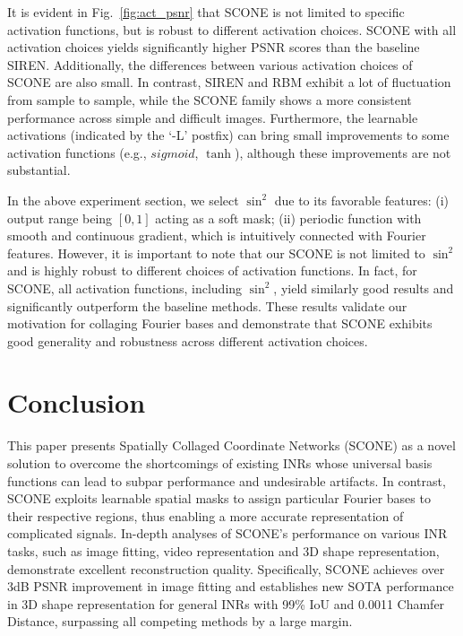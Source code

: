 \documentclass[letterpaper]{article} %
\begin{document}
It is evident in Fig.~\ref{fig:act_psnr} that SCONE is not limited to specific activation functions, but is robust to different activation choices. SCONE with all activation choices yields significantly higher PSNR scores than the baseline SIREN. Additionally, the differences between various activation choices of SCONE are also small. In contrast, SIREN and RBM exhibit a lot of fluctuation from sample to sample, while the SCONE family shows a more consistent performance across simple and difficult images. Furthermore, the learnable activations (indicated by the `-L' postfix) can bring small improvements to some activation functions (e.g.,  $\textit{sigmoid}$, $\tanh$), although these improvements are not substantial.


In the above experiment section,  we select $\sin^2$ due to its favorable features: (i) output range being $[0,1]$ acting as a soft mask; (ii) periodic function with smooth and continuous gradient, which is intuitively connected with Fourier features. However, it is important to note that our SCONE is not limited to $\sin^2$ and is highly robust to different choices of activation functions. In fact, for SCONE, all activation functions, including $\sin^2$, yield similarly good results and significantly outperform the baseline methods. These results validate our motivation for collaging Fourier bases and demonstrate that SCONE exhibits good generality and robustness across different activation choices.

\section{Conclusion}
\label{sec:conclusion}
This paper presents Spatially Collaged Coordinate Networks (SCONE) as a novel solution to overcome the shortcomings of existing INRs whose universal basis functions can lead to subpar performance and undesirable artifacts. In contrast, SCONE exploits learnable spatial masks to assign particular Fourier bases to their respective regions, thus enabling a more accurate representation of complicated signals. In-depth analyses of SCONE's performance on various INR tasks, such as image fitting, video representation and 3D shape representation, demonstrate excellent reconstruction quality. Specifically, SCONE achieves over 3dB PSNR improvement in image fitting and establishes new SOTA performance in 3D shape representation for general INRs with 99\% IoU and 0.0011 Chamfer Distance, surpassing all competing methods by a large margin.
\end{document}
